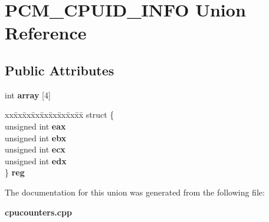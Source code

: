 \section{P\+C\+M\+\_\+\+C\+P\+U\+I\+D\+\_\+\+I\+N\+FO Union Reference}
\label{unionPCM__CPUID__INFO}
\subsection*{Public Attributes}
\begin{DoxyCompactItemize}
\item 
int {\bfseries array} [4]\label{unionPCM__CPUID__INFO_ad6b8b5c108abcb429d64f6c27f4febe0}

\item 
\begin{tabbing}
xx\=xx\=xx\=xx\=xx\=xx\=xx\=xx\=xx\=\kill
struct \{\\
\>unsigned int {\bfseries eax}\\
\>unsigned int {\bfseries ebx}\\
\>unsigned int {\bfseries ecx}\\
\>unsigned int {\bfseries edx}\\
\} {\bfseries reg}\label{unionPCM__CPUID__INFO_a2f6fdd256c2243989c717f14155820c3}
\\

\end{tabbing}\end{DoxyCompactItemize}


The documentation for this union was generated from the following file\+:\begin{DoxyCompactItemize}
\item 
{\bf cpucounters.\+cpp}\end{DoxyCompactItemize}
